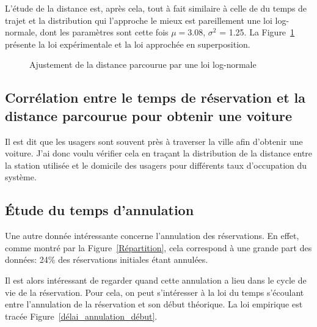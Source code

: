 \documentclass[12pt,a4paper]{article}
\newcommand{\1}[1]{\mathbbm{1}_{\{#1\}} }
\theoremstyle{definition}
\begin{document}
{L'étude de la distance est, après cela, tout à fait similaire à celle de du temps de trajet et la distribution qui l'approche le mieux est pareillement une loi log-normale, dont les paramètres sont cette fois $\mu = 3.08 $, $\sigma^2$ = 1.25. La Figure~\ref{Ajustement_distance} présente la loi expérimentale et la loi approchée en superposition.

\begin{figure}[!h]
\centering
{}
\caption{Ajustement de la distance parcourue par une loi log-normale}
\label{Ajustement_distance}
\end{figure}

\subsection{Corrélation entre le temps de réservation et la distance parcourue pour obtenir une voiture}

Il est dit que les usagers sont souvent près à traverser la ville afin d'obtenir une voiture. J'ai donc voulu vérifier cela en traçant la distribution de la distance entre la station utilisée et le domicile des usagers pour différents taux d'occupation du système.



\subsection{Étude du temps d'annulation}



Une autre donnée intéressante concerne l'annulation des réservations. En effet, comme montré par la Figure~\ref{Répartition}, cela correspond à une grande part des données: 24\% des réservations initiales étant annulées. 

Il est alors intéressant de regarder quand cette annulation a lieu dans le cycle de vie de la réservation. Pour cela, on peut s'intéresser à la loi du temps s'écoulant entre l'annulation de la réservation et son début théorique. La loi empirique est tracée Figure~\ref{délai_annulation_début}.

}
\end{document}
